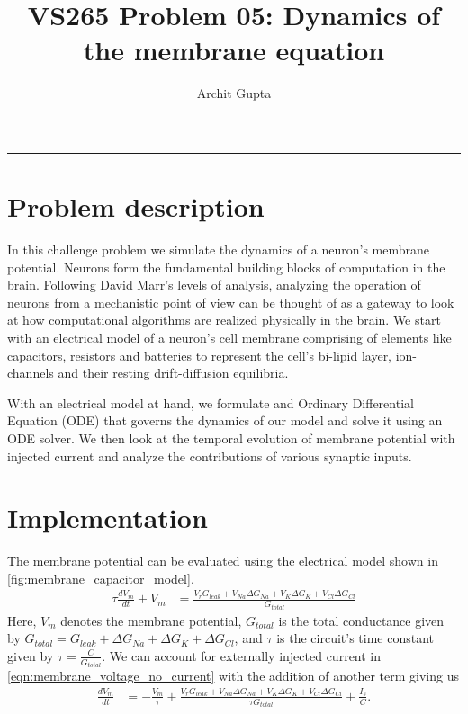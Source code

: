 \documentclass[10pt,onecolumn]{article}
\title{VS265 Problem 05: Dynamics of the membrane equation}
\author{Archit Gupta}
\date{}
\begin{document}
    \maketitle
    \vspace{-2em}
    \noindent\rule{\textwidth}{1.4pt}
    \vspace{1em}

    \section{Problem description}
    \label{sec:problem_description}
    In this challenge problem we simulate the dynamics of a neuron's membrane potential.
    Neurons form the fundamental building blocks of computation in the brain.
    Following David Marr's levels of analysis, analyzing the operation of neurons from a mechanistic point of view can be thought of as a gateway to look at how computational algorithms are realized physically in the brain.
    We start with an electrical model of a neuron's cell membrane comprising of elements like capacitors, resistors and batteries to represent the cell's bi-lipid layer, ion-channels and their resting drift-diffusion equilibria.
    
    With an electrical model at hand, we formulate and Ordinary Differential Equation (ODE) that governs the dynamics of our model and solve it using an ODE solver.
    We then look at the temporal evolution of membrane potential with injected current and analyze the  contributions of various synaptic inputs.

    \section{Implementation}
    \label{sec:implementation}
    
    The membrane potential can be evaluated using the electrical model shown in \cref{fig:membrane_capacitor_model}.
    \begin{align}
        \tau\frac{dV_{m}}{dt} + V_{m} &= \frac{V_{r}G_{leak} + V_{Na}\Delta{G_{Na}} + V_{K}\Delta{G_{K}} + V_{Cl}\Delta{G_{Cl}}}{G_{total}}
        \label{eqn:membrane_voltage_no_current}
    \end{align}
    Here, $V_{m}$ denotes the membrane potential, $G_{total}$ is the total conductance given by $G_{total} = G_{leak} + \Delta{G_{Na}} + \Delta{G_{K}} + \Delta{G_{Cl}}$, and $\tau$ is the circuit's time constant given by $\tau=\frac{C}{G_{total}}$.
    We can account for externally injected current in \cref{eqn:membrane_voltage_no_current} with the addition of another term giving us
    \begin{align}
        \frac{dV_{m}}{dt} &= -\frac{V_{m}}{\tau} + \frac{V_{r}G_{leak} + V_{Na}\Delta{G_{Na}} + V_{K}\Delta{G_{K}} + V_{Cl}\Delta{G_{Cl}}}{\tau G_{total}} + \frac{I_{s}}{C}.
        \label{eqn:membrane_voltage_with_current}
    \end{align}
\end{document}
